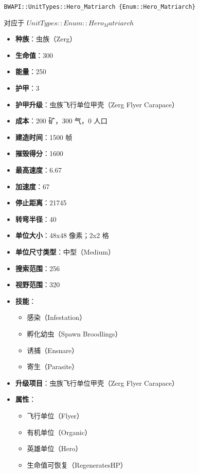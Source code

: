 \begin{tcolorbox}[colback=white, colframe=black!60!white, title=Hero\_Matriarch(), arc=0mm]
    \begin{verbatim}
BWAPI::UnitTypes::Hero_Matriarch {Enum::Hero_Matriarch}
    \end{verbatim}
    对应于  $ UnitTypes::Enum::Hero_Matriarch $ 
    \begin{itemize}
        \item \textbf{种族}：虫族（Zerg）
        \item \textbf{生命值}：300
        \item \textbf{能量}：250
        \item \textbf{护甲}：3
        \item \textbf{护甲升级}：虫族飞行单位甲壳（Zerg Flyer Carapace）
        \item \textbf{成本}：200 矿，300 气，0 人口
        \item \textbf{建造时间}：1500 帧
        \item \textbf{摧毁得分}：1600
        \item \textbf{最高速度}：6.67
        \item \textbf{加速度}：67
        \item \textbf{停止距离}：21745
        \item \textbf{转弯半径}：40
        \item \textbf{单位大小}：48x48 像素；2x2 格
        \item \textbf{单位尺寸类型}：中型（Medium）
        \item \textbf{搜索范围}：256
        \item \textbf{视野范围}：320
        \item \textbf{技能}：
            \begin{itemize}
                \item 感染（Infestation）
                \item 孵化幼虫（Spawn Broodlings）
                \item 诱捕（Ensnare）
                \item 寄生（Parasite）
            \end{itemize}
        \item \textbf{升级项目}：虫族飞行单位甲壳（Zerg Flyer Carapace）
        \item \textbf{属性}：
            \begin{itemize}
                \item 飞行单位（Flyer）
                \item 有机单位（Organic）
                \item 英雄单位（Hero）
                \item 生命值可恢复（RegeneratesHP）
            \end{itemize}
    \end{itemize}
\end{tcolorbox}

